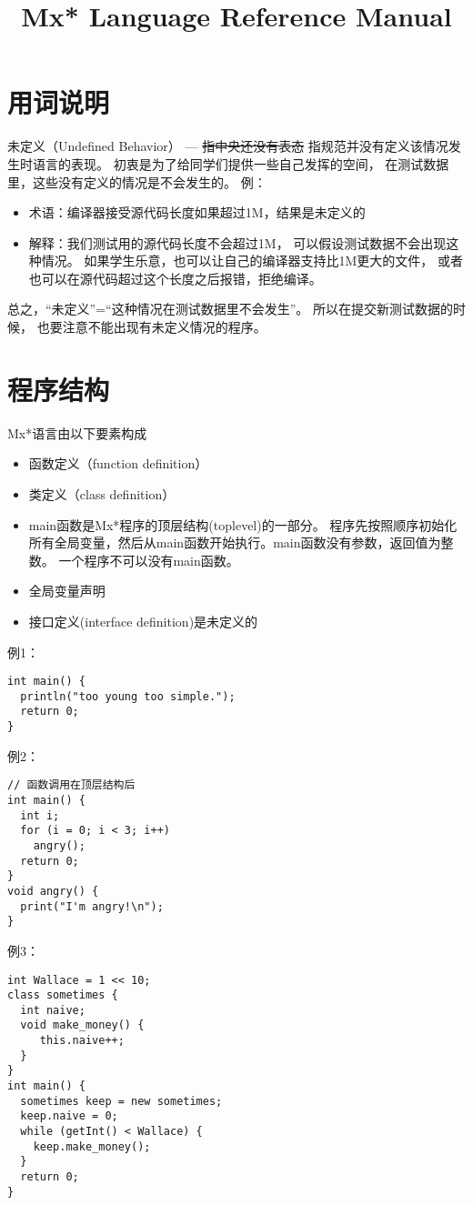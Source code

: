 \documentclass[twocolumn]{article}
\begin{document}
\title{Mx* Language Reference Manual} 
\maketitle

\section{用词说明}

未定义（Undefined Behavior） --- \sout{指中央还没有表态}
指规范并没有定义该情况发生时语言的表现。
初衷是为了给同学们提供一些自己发挥的空间，
在测试数据里，这些没有定义的情况是不会发生的。
例：
\begin{itemize}
\item 术语：编译器接受源代码长度如果超过1M，结果是未定义的
\item 解释：我们测试用的源代码长度不会超过1M，
可以假设测试数据不会出现这种情况。
如果学生乐意，也可以让自己的编译器支持比1M更大的文件，
或者也可以在源代码超过这个长度之后报错，拒绝编译。
\end{itemize}
总之，“未定义”=“这种情况在测试数据里不会发生”。
所以在提交新测试数据的时候，
也要注意不能出现有未定义情况的程序。

\section{程序结构}
Mx*语言由以下要素构成
\begin{itemize}
\item 函数定义（function definition）
\item 类定义（class definition）
\item main函数是Mx*程序的顶层结构(toplevel)的一部分。
程序先按照顺序初始化所有全局变量，然后从main函数开始执行。main函数没有参数，返回值为整数。
一个程序不可以没有main函数。
\item 全局变量声明
\item 接口定义(interface definition)是未定义的
\end{itemize}
例1：
\begin{verbatim}
int main() {
  println("too young too simple.");
  return 0;
}
\end{verbatim}
例2：
\begin{verbatim}
// 函数调用在顶层结构后
int main() {
  int i;
  for (i = 0; i < 3; i++) 
    angry();
  return 0;
}
void angry() {
  print("I'm angry!\n");
}
\end{verbatim}
例3：
\begin{verbatim}
int Wallace = 1 << 10;
class sometimes {
  int naive;
  void make_money() {
     this.naive++;
  }
}
int main() {
  sometimes keep = new sometimes;
  keep.naive = 0;
  while (getInt() < Wallace) { 
    keep.make_money();
  }
  return 0;
}
\end{verbatim}
\end{document}
